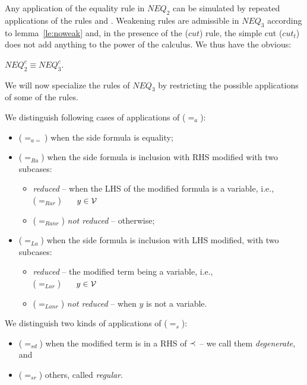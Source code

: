 \noindent
Any application of the equality rule  in $NEQ_2$ can be simulated
by repeated applications of the rules  and . 
Weakening rules are admissible in $NEQ_3$ according to lemma~\ref{le:noweak} and, in
the presence of the ($cut$) rule, the simple cut ($cut_t$) does not add anything to the
power of the calculus.
We thus have the obvious:
\begin{LEMMA}\label{le:neq2isneq3}
 $NEQ_2^c \equiv NEQ_3^c$.
\end{LEMMA}
%
\noindent
We will now specialize the rules of $NEQ_3$ by restricting the possible
applications of some of the rules.
%
\begin{DEFINITION}\label{de:eqALR}\label{de:eqSD}\label{de:inclad}\label{de:anr}
We distinguish following cases of applications of ($=_a$):
\begin{itemize}\MyLPar
\item ($=_{a=}$) when the side formula is equality;
\item ($=_{Ra}$) when the side formula is inclusion with RHS modified with
two subcases:
\begin{itemize}\MyLPar
\item {\em reduced} -- when the LHS of the modified formula is a
variable, i.e., \\
 ($=_{Rar}$)\ \  \ $y\in{\cal V}$
\item ($=_{Ranr}$) {\em not reduced} -- otherwise;
\end{itemize}
\item ($=_{La}$) when the side formula is inclusion with LHS modified, with
two subcases:
\begin{itemize}\MyLPar
\item {\em reduced} -- the modified term being a variable, i.e., \\
  ($=_{Lar}$) \ \ \ $y\in{\cal V}$
\item ($=_{Lanr}$) {\em not reduced} -- when $y$ is not a variable.
\end{itemize}
\end{itemize}
We distinguish two kinds of applications of ($=_s$):
\begin{itemize}\MyLPar
\item ($=_{sd}$)  when the modified term is in a RHS of $\mathbin{\prec}$ -- we call
them {\em degenerate}, and
\item ($=_{sr}$) others, called {\em regular}.

\end{itemize}
\end{DEFINITION}
